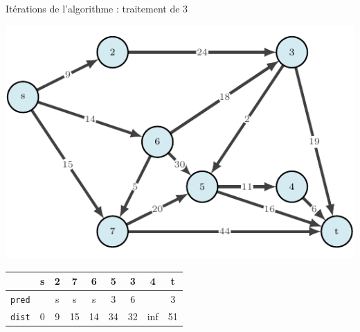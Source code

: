 \begin{frame}{Itérations de l'algorithme : traitement de $3$}
    \begin{center}
        \includegraphics[height=.6\textheight]{fig/dijkstra-0.pdf}      
    \begin{tabular}{c|cccccccc}
      
        & \textbf{s}   &\textbf{2}     &\textbf{7}     &\textbf{6}     &5      &\textbf{3}     &4      &t      \\
        \hline
        \texttt{pred} & &s      &s      &s      &3      &6      &       &3      \\
        \texttt{dist} & 0       &9      &15     &14     &34     &32     &inf    &51     \\
    \end{tabular}
\end{center}
\end{frame}

